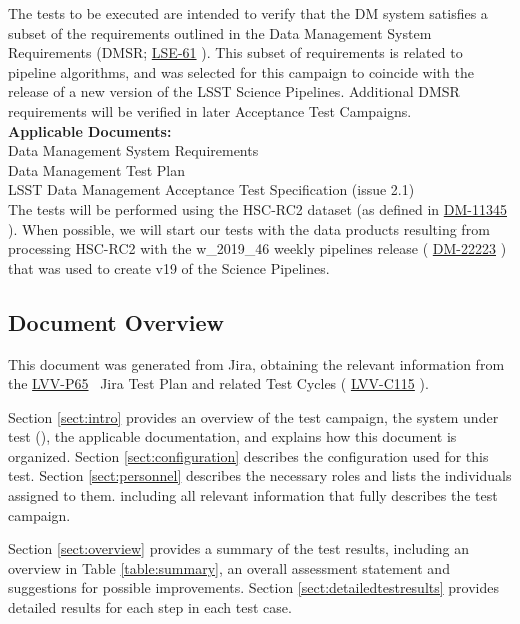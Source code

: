 \documentclass[DM,lsstdraft,STR,toc]{lsstdoc}
\begin{document}
 The tests to be executed are intended to verify that the DM system
satisfies a subset of the requirements outlined in the Data Management
System Requirements (DMSR; \href{https://lse-61.lsst.io/}{LSE-61} ).
This subset of requirements is related to pipeline algorithms, and was
selected for this campaign to coincide with the release of a new version
of the LSST Science Pipelines. Additional DMSR requirements will be
verified in later Acceptance Test
Campaigns.\\[2\baselineskip]\textbf{Applicable
Documents:}\\[2\baselineskip] Data Management System
Requirements\\
 Data Management Test Plan\\
 LSST Data Management Acceptance Test Specification (issue
2.1)\\[2\baselineskip]The tests will be performed using the HSC-RC2
dataset (as defined in
\href{https://jira.lsstcorp.org/browse/DM-11345}{DM-11345} ). When
possible, we will start our tests with the data products resulting from
processing HSC-RC2 with the w\_2019\_46 weekly pipelines release (
\href{https://jira.lsstcorp.org/browse/DM-22223}{DM-22223} ) that was
used to create v19 of the Science Pipelines.~


\subsection{Document Overview}
\label{sect:docoverview}

This document was generated from Jira, obtaining the relevant information from the 
\href{https://jira.lsstcorp.org/secure/Tests.jspa#/testPlan/LVV-P65}{LVV-P65}
~Jira Test Plan and related Test Cycles (
  \href{https://jira.lsstcorp.org/secure/Tests.jspa#/testCycle/LVV-C115}{LVV-C115}
).

Section \ref{sect:intro} provides an overview of the test campaign, the system under test (\product{}),
the applicable documentation, and explains how this document is organized.
Section \ref{sect:configuration}  describes the configuration used for this test.
Section \ref{sect:personnel} describes the necessary roles and lists the individuals assigned to them.
including all relevant information that fully describes the test campaign.

Section \ref{sect:overview} provides a summary of the test results, including an overview in Table \ref{table:summary},
an overall assessment statement and suggestions for possible improvements.
Section \ref{sect:detailedtestresults} provides detailed results for each step in each test case.
\end{document}
